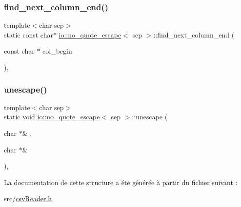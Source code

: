 \subsubsection{\texorpdfstring{find\+\_\+next\+\_\+column\+\_\+end()}{find\_next\_column\_end()}}
{\footnotesize\ttfamily template$<$char sep$>$ \\
static const char$\ast$ \hyperlink{structio_1_1no__quote__escape}{io\+::no\+\_\+quote\+\_\+escape}$<$ sep $>$\+::find\+\_\+next\+\_\+column\+\_\+end (\begin{DoxyParamCaption}\item[{const char $\ast$}]{col\+\_\+begin }\end{DoxyParamCaption})\hspace{0.3cm}{\ttfamily [inline]}, {\ttfamily [static]}}

\mbox{\label{structio_1_1no__quote__escape_af1c217f2c995d178a91c58235191b052}} 
\subsubsection{\texorpdfstring{unescape()}{unescape()}}
{\footnotesize\ttfamily template$<$char sep$>$ \\
static void \hyperlink{structio_1_1no__quote__escape}{io\+::no\+\_\+quote\+\_\+escape}$<$ sep $>$\+::unescape (\begin{DoxyParamCaption}\item[{char $\ast$\&}]{,  }\item[{char $\ast$\&}]{ }\end{DoxyParamCaption})\hspace{0.3cm}{\ttfamily [inline]}, {\ttfamily [static]}}



La documentation de cette structure a été générée à partir du fichier suivant \+:\begin{DoxyCompactItemize}
\item 
src/\hyperlink{csvReader_8h}{csv\+Reader.\+h}\end{DoxyCompactItemize}
